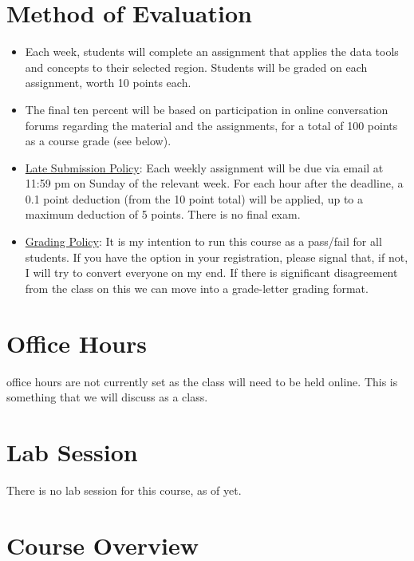 \documentclass[11pt,]{article}
\begin{document}
\hypertarget{method-of-evaluation}{%
\section{Method of Evaluation}\label{method-of-evaluation}}

\begin{itemize}
\item
  Each week, students will complete an assignment that applies the data
  tools and concepts to their selected region. Students will be graded
  on each assignment, worth 10 points each.
\item
  The final ten percent will be based on participation in online
  conversation forums regarding the material and the assignments, for a
  total of 100 points as a course grade (see below).
\item
  \underline{Late Submission Policy}: Each weekly assignment will be due
  via email at 11:59 pm on Sunday of the relevant week. For each hour
  after the deadline, a 0.1 point deduction (from the 10 point total)
  will be applied, up to a maximum deduction of 5 points. There is no
  final exam.
\item
  \underline{Grading Policy}: It is my intention to run this course as a
  pass/fail for all students. If you have the option in your
  registration, please signal that, if not, I will try to convert
  everyone on my end. If there is significant disagreement from the
  class on this we can move into a grade-letter grading format.
\end{itemize}

\hypertarget{office-hours}{%
\section{Office Hours}\label{office-hours}}

office hours are not currently set as the class will need to be held
online. This is something that we will discuss as a class.

\hypertarget{lab-session}{%
\section{Lab Session}\label{lab-session}}

There is no lab session for this course, as of yet.

\hypertarget{course-overview}{%
\section{Course Overview}\label{course-overview}}
\end{document}
